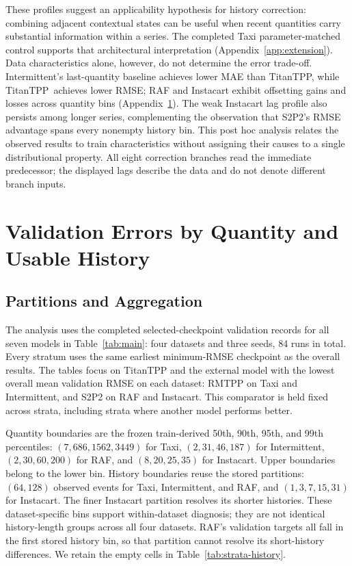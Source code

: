 \documentclass[runningheads]{llncs}
\newcommand{\method}{TitanTPP}
\begin{document}
These profiles suggest an applicability hypothesis for history correction:
combining adjacent contextual states can be useful when recent quantities
carry substantial information within a series. The completed Taxi
parameter-matched control supports that architectural interpretation
(Appendix~\ref{app:extension}). Data characteristics alone, however, do
not determine the error trade-off. Intermittent's last-quantity baseline
achieves lower MAE than \method, while \method\ achieves lower RMSE;
RAF and Instacart exhibit offsetting gains and losses across quantity bins
(Appendix~\ref{app:strata}). The weak Instacart lag profile also persists
among longer series, complementing the observation that S2P2's RMSE
advantage spans every nonempty history bin. This post hoc analysis relates
the observed results to train characteristics without assigning their
causes to a single distributional property. All eight correction branches
read the immediate predecessor; the displayed lags describe the data and
do not denote different branch inputs.

\section{Validation Errors by Quantity and Usable History}\label{app:strata}
\subsection{Partitions and Aggregation}
The analysis uses the completed selected-checkpoint validation records for
all seven models in Table~\ref{tab:main}: four datasets and three seeds,
84 runs in total. Every stratum uses the same earliest minimum-RMSE
checkpoint as the overall results. The tables focus on TitanTPP and the
external model with the lowest overall mean validation RMSE on each dataset:
RMTPP on Taxi and Intermittent, and S2P2 on RAF and Instacart. This comparator
is held fixed across strata, including strata where another model performs
better.

Quantity boundaries are the frozen train-derived 50th, 90th, 95th, and
99th percentiles: $(7,686,1562,3449)$ for Taxi, $(2,31,46,187)$ for
Intermittent, $(2,30,60,200)$ for RAF, and $(8,20,25,35)$ for Instacart.
Upper boundaries belong to the lower bin. History boundaries reuse the
stored partitions: $(64,128)$ observed events for Taxi, Intermittent, and
RAF, and $(1,3,7,15,31)$ for Instacart. The finer Instacart partition
resolves its shorter histories. These dataset-specific bins support
within-dataset diagnosis; they are not identical history-length groups
across all four datasets. RAF's validation targets all fall in the first
stored history bin, so that partition cannot resolve its short-history
differences. We retain the empty cells in Table~\ref{tab:strata-history}.
\end{document}
